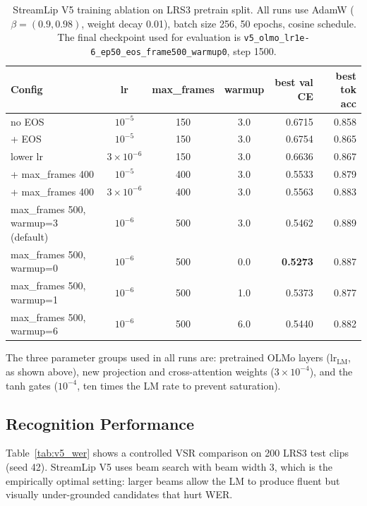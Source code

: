 \documentclass{article}
\begin{document}
\begin{table}[h]
\centering
\small
\begin{tabular}{@{}lcccrr@{}}
\toprule
\textbf{Config} & \textbf{lr} & \textbf{max\_frames} & \textbf{warmup} &
    \textbf{best val CE} & \textbf{best tok acc} \\
\midrule
no EOS              & $10^{-5}$        & 150 & 3.0 & 0.6715 & 0.858 \\
+ EOS               & $10^{-5}$        & 150 & 3.0 & 0.6754 & 0.865 \\
lower lr            & $3\times10^{-6}$ & 150 & 3.0 & 0.6636 & 0.867 \\
\midrule
+ max\_frames 400   & $10^{-5}$        & 400 & 3.0 & 0.5533 & 0.879 \\
+ max\_frames 400   & $3\times10^{-6}$ & 400 & 3.0 & 0.5563 & 0.883 \\
\midrule
max\_frames 500, warmup=3 (default) & $10^{-6}$  & 500 & 3.0 & 0.5462 & 0.889 \\
max\_frames 500, warmup=0 & $10^{-6}$  & 500 & 0.0 & \textbf{0.5273} & 0.887 \\
max\_frames 500, warmup=1 & $10^{-6}$  & 500 & 1.0 & 0.5373 & 0.877 \\
max\_frames 500, warmup=6 & $10^{-6}$  & 500 & 6.0 & 0.5440 & 0.882 \\
\bottomrule
\end{tabular}
\caption{StreamLip V5 training ablation on LRS3 pretrain split.
All runs use AdamW ($\beta=(0.9,0.98)$, weight decay 0.01), batch size 256,
50 epochs, cosine schedule.
The final checkpoint used for evaluation is
\texttt{v5\_olmo\_lr1e-6\_ep50\_eos\_frame500\_warmup0}, step 1500.}
\label{tab:v5_ablation}
\end{table}

The three parameter groups used in all runs are: pretrained OLMo layers
($\text{lr}_{\text{LM}}$, as shown above), new projection and cross-attention
weights ($3\times10^{-4}$), and the tanh gates ($10^{-4}$, ten times the LM
rate to prevent saturation).

\subsection{Recognition Performance}

Table~\ref{tab:v5_wer} shows a controlled VSR comparison on 200 LRS3 test
clips (seed 42). StreamLip V5 uses beam search with beam width 3, which is the
empirically optimal setting: larger beams allow the LM to produce fluent but
visually under-grounded candidates that hurt WER.
\end{document}

